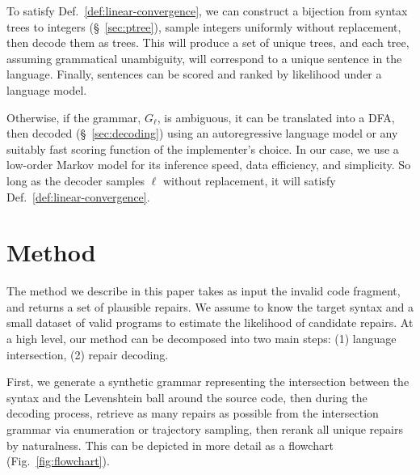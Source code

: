 \documentclass[sigplan,acmsmall,nonacm,screen]{acmart}\settopmatter{printfolios=false,printccs=false,printacmref=false}
\begin{document}
  To satisfy Def.~\ref{def:linear-convergence}, we can construct a bijection from syntax trees to integers (\S~\ref{sec:ptree}), sample integers uniformly without replacement, then decode them as trees. This will produce a set of unique trees, and each tree, assuming grammatical unambiguity, will correspond to a unique sentence in the language.  Finally, sentences can be scored and ranked by likelihood under a language model.

  Otherwise, if the grammar, $G_\ell$, is ambiguous, it can be translated into a DFA, then decoded (\S~\ref{sec:decoding}) using an autoregressive language model or any suitably fast scoring function of the implementer's choice. In our case, we use a low-order Markov model for its inference speed, data efficiency, and simplicity. So long as the decoder samples $\ell$ without replacement, it will satisfy Def.~\ref{def:linear-convergence}.


  \clearpage\section{Method}

  The method we describe in this paper takes as input the invalid code fragment, and returns a set of plausible repairs. We assume to know the target syntax and a small dataset of valid programs to estimate the likelihood of candidate repairs. At a high level, our method can be decomposed into two main steps: (1) language intersection, (2) repair decoding.

First, we generate a synthetic grammar representing the intersection between the syntax and the Levenshtein ball around the source code, then during the decoding process, retrieve as many repairs as possible from the intersection grammar via enumeration or trajectory sampling, then rerank all unique repairs by naturalness. This can be depicted in more detail as a flowchart (Fig.~\ref{fig:flowchart}).
\end{document}
